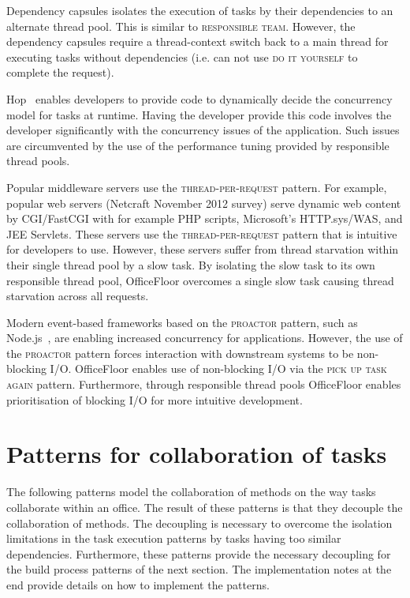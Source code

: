 \documentclass[prodmode]{style/acmlarge}
\begin{document}
Dependency capsules \cite{dependency-capsules} isolates the execution of tasks
by their dependencies to an alternate thread pool.  This is similar to
\textsc{responsible team}.  However, the dependency capsules require a
thread-context switch back to a main thread for executing tasks without
dependencies (i.e. can not use \textsc{do it yourself} to complete the request).

Hop~\cite{hop} enables developers to provide code to dynamically decide the
concurrency model for tasks at runtime.  Having the developer provide this code
involves the developer significantly with the concurrency issues of the
application.  Such issues are circumvented by the use of the performance tuning
provided by responsible thread pools.

Popular middleware servers use the \textsc{thread-per-request} pattern.
For example, popular web servers (Netcraft November 2012 survey) serve dynamic
web content by CGI/FastCGI with for example PHP scripts, Microsoft's
HTTP.sys/WAS, and JEE Servlets. These servers use the
\textsc{thread-per-request} pattern that is intuitive for developers to use.
However, these servers suffer from thread starvation within their single thread
pool by a slow task.  By isolating the slow task to its own responsible thread
pool, OfficeFloor overcomes a single slow task causing thread starvation across
all requests.

Modern event-based frameworks based on the \textsc{proactor} pattern, such as
Node.js~\cite{nodejs}, are enabling increased concurrency for applications.
However, the use of the \textsc{proactor} pattern forces interaction with
downstream systems to be non-blocking I/O.  OfficeFloor enables use of
non-blocking I/O via the \textsc{pick up task again} pattern.  Furthermore,
through responsible thread pools OfficeFloor enables prioritisation of blocking
I/O for more intuitive development.




\section{Patterns for collaboration of tasks}

The following patterns model the collaboration of methods on the way tasks
collaborate within an office.  The result of these patterns is that they
decouple the collaboration of methods.  The decoupling is necessary to overcome
the isolation limitations in the task execution patterns by tasks having too
similar dependencies.  Furthermore, these patterns provide the necessary
decoupling for the build process patterns of the next section.  The
implementation notes at the end provide details on how to implement the
patterns.
\end{document}
